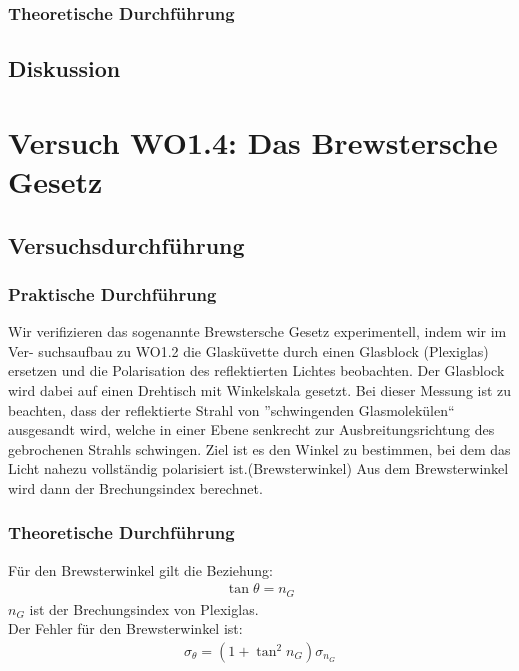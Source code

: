 \documentclass[12pt]{scrartcl}
\begin{document}
\subsubsection{Theoretische Durchführung}
\subsection{Diskussion}

\section{Versuch WO1.4:
Das Brewstersche Gesetz}
\subsection{Versuchsdurchführung}
\subsubsection{Praktische Durchführung}
Wir verifizieren das sogenannte Brewstersche Gesetz experimentell, indem wir im Ver-
suchsaufbau zu WO1.2 die Glasküvette durch einen Glasblock (Plexiglas) ersetzen und
die Polarisation des reflektierten Lichtes beobachten.
Der Glasblock wird dabei auf einen Drehtisch mit Winkelskala gesetzt.
Bei dieser Messung ist zu beachten, dass der reflektierte Strahl von ”schwingenden Glasmolekülen“ ausgesandt wird, welche in einer Ebene
senkrecht zur Ausbreitungsrichtung des gebrochenen Strahls schwingen.
Ziel ist es den Winkel zu bestimmen, bei dem das Licht nahezu vollständig polarisiert ist.(Brewsterwinkel)
Aus dem Brewsterwinkel wird dann %
der Brechungsindex berechnet.
\subsubsection{Theoretische Durchführung}
Für den Brewsterwinkel gilt die Beziehung:
\begin{align}
\tan{\theta} = n_G
\end{align}
$n_G$ ist der Brechungsindex von Plexiglas.\\
Der Fehler für den Brewsterwinkel ist:
\begin{align}
\sigma_\theta = (1+\tan^2{n_G})\sigma_{n_G}
\end{align}
\end{document}
